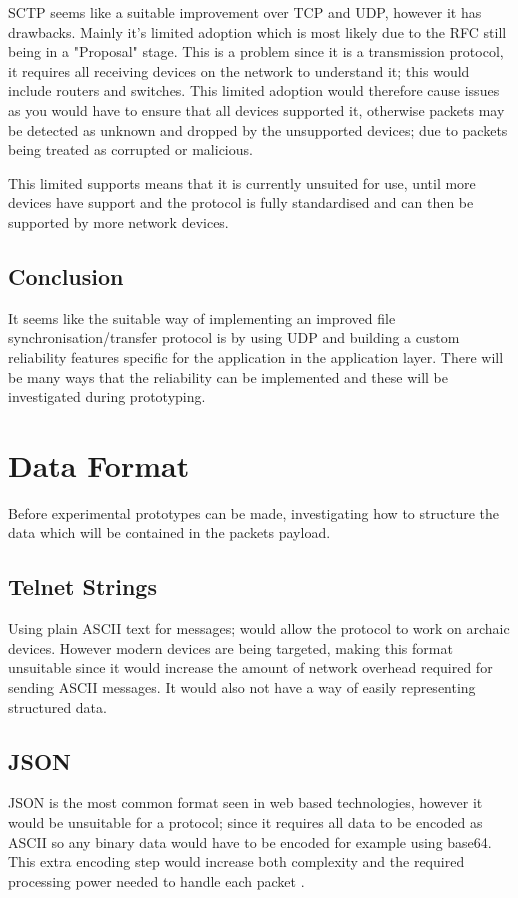 SCTP seems like a suitable improvement over TCP and UDP, however it has drawbacks. Mainly it's limited adoption which is most likely due to the RFC still being in a "Proposal" stage. This is a problem since it is a transmission protocol, it requires all receiving devices on the network to understand it; this would include routers and switches. This limited adoption would therefore cause issues as you would have to ensure that all devices supported it, otherwise packets may be detected as unknown and dropped by the unsupported devices; due to packets being treated as corrupted or malicious.

This limited supports means that it is currently unsuited for use, until more devices have support and the protocol is fully standardised and can then be supported by more network devices.

\subsection*{Conclusion}
It seems like the suitable way of implementing an improved file synchronisation/transfer protocol is by using UDP and building a custom reliability features specific for the application in the application layer. There will be many ways that the reliability can be implemented and these will be investigated during prototyping.


\section{Data Format}
Before experimental prototypes can be made, investigating how to structure the data which will be contained in the packets payload.

\subsection*{Telnet Strings}
Using plain ASCII text for messages; would allow the protocol to work on archaic devices. However modern devices are being targeted, making this format unsuitable since it would increase the amount of network overhead required for sending ASCII messages. It would also not have a way of easily representing structured data.

\subsection*{JSON}
JSON is the most common format seen in web based technologies, however it would be unsuitable for a protocol; since it requires all data to be encoded as ASCII so any binary data would have to be encoded for example using base64. This extra encoding step would increase both complexity and the required processing power needed to handle each packet \parencite{json-rfc8259}.


